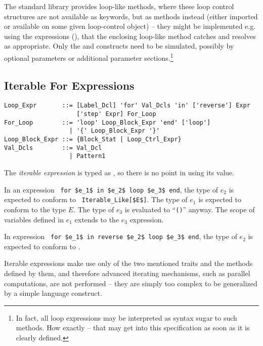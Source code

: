 The standard library provides loop-like methods, where these loop control structures are not available as keywords, but as methods instead (either imported or available on some given loop-control object) -- they might be implemented e.g. using the  expressions (), that the enclosing loop-like method catches and resolves as appropriate. Only the  and  constructs need to be simulated, possibly by optional parameters or additional parameter sections.\footnote{In fact, all loop expressions may be interpreted as syntax sugar to such methods. How exactly -- that may get into this specification as soon as it is clearly defined.} 





\subsection{Iterable For Expressions}
\label{sec:iterable-expressions}

\syntax\begin{lstlisting}
Loop_Expr       ::= [Label_Dcl] 'for' Val_Dcls 'in' ['reverse'] Expr 
                    ['step' Expr] For_Loop
For_Loop        ::= 'loop' Loop_Block_Expr 'end' ['loop']
                  | '{' Loop_Block_Expr '}'
Loop_Block_Expr ::= {Block_Stat | Loop_Ctrl_Expr}
Val_Dcls        ::= Val_Dcl
                  | Pattern1
\end{lstlisting}

The {\em iterable expression} is typed as , so there is no point in using its value. 

In an expression ~\lstinline!for $e_1$ in $e_2$ loop $e_3$ end!, the type of $e_2$ is expected to conform to ~\lstinline!Iterable_Like[$E$]!. The type of $e_1$ is expected to conform to the type $E$. The type of $e_3$ is evaluated to ``\lstinline!()!'' anyway. The scope of variables defined in $e_1$ extends to the $e_3$ expression. 

In expression ~\lstinline!for $e_1$ in reverse $e_2$ loop $e_3$ end!, the type of $e_2$ is expected to conform to . 

Iterable expressions make use only of the two mentioned traits and the methods defined by them, and therefore advanced iterating mechanisms, such as parallel computations, are not performed -- they are simply too complex to be generalized by a simple language construct. 

